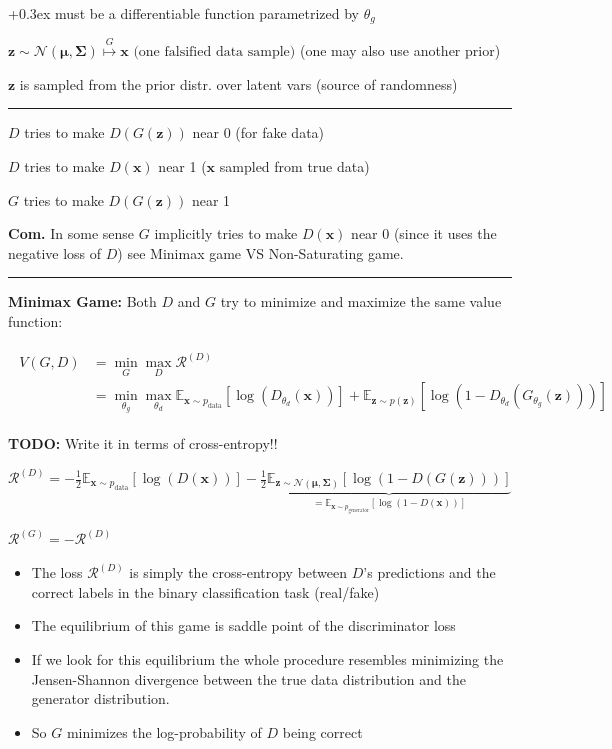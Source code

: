 \documentclass[a2paper,8pt]{extarticle}
\newcommand{\cN}{\mathcal{N}}
\newcommand{\cR}{\mathcal{R}}
\newcommand{\Exp}[2][]{{\mathbb{E}_{#1}}\left[ #2
\right]}
\newcommand{\mat}[1]{\mathbf{#1}}
\renewcommand{\vec}[1]{\mathbf{#1}}
\newcommand{\vx}{\vec{x}}
\newcommand{\vz}{\vec{z}}
\newcommand{\vmu}{\boldsymbol{\mu}}
\newcommand{\MSigma}{\mat{\Sigma}}
\newcommand{\todo}[1]{\textbf{TODO:} #1}
\newcommand{\todo}[1]{%
}
\newcommand{\customboxpaddingsize}{0pt}
\newcommand{\emptyarg}[1][]{\ifthenelse{\isempty{#1}}{}{\ (#1)}}
\newcommand{\Def}[1][]{{\setlength\fboxsep{\customboxpaddingsize}
\colorbox{defcolor}{%
\color{custtitlecolor}{\textbf{D.\emptyarg[#1]}}}\kern+0.3ex}}
\newcommand{\Com}{\textbf{Com.} }
\newcommand{\sep}{\vspace{0pt}\noindent\hrule\vspace{0pt}}
\newcommand{\ssep}{\hdashrule[1.1ex]{\linewidth}{0.1pt}{0.3mm}\vspace{-6pt}}
\newcommand{\sep}{\vspace{5pt}\noindent\hrule\vspace{5pt}}
\newcommand{\ssep}{\hdashrule[1.1ex]{\linewidth}{0.1pt}{0.3mm}\vspace{-3pt}}
\begin{document}
\begin{landscape}
\begin{multicols*}{7}
\ssep

\Def[Generator $G$] must be a differentiable function parametrized by $\theta_g$

$
\vz\sim\cN(\vmu,\MSigma)
\stackrel{G}{\mapsto}
\vx
\text{ (one falsified data sample)}
$ (one may also use another prior)

$\vz$ is sampled from the prior distr. over latent vars (source of randomness)

\sep

$D$ tries to make $D(G(\vz))$ near 0 (for fake data)

$D$ tries to make $D(\vx)$ near 1 ($\vx$ sampled from true data)

$G$ tries to make $D(G(\vz))$ near 1

\Com In some sense $G$ implicitly tries to make $D(\vx)$ near 0 (since it uses
the negative loss of $D$) see Minimax game VS Non-Saturating game.

\sep

\textbf{Minimax Game:} Both $D$ and $G$ try to minimize and maximize the same
value function:

\begin{gather*}
\begin{align*}
V(G,D)
&=\min_{G}\max_{D} \cR^{(D)}
\\
&=\min_{\theta_g}\max_{\theta_d}
\Exp[\vx\sim p_{\text{data}}]{\log(D_{\theta_d}(\vx))}
+
\Exp[\vz\sim p(\vz)]{\log(1-D_{\theta_d}(G_{\theta_g}(\vz)))}
\end{align*}
\end{gather*}

\todo{Write it in terms of cross-entropy!!}

$
\cR^{(D)}
=
-\frac{1}{2}
\Exp[\vx\sim p_{\text{data}}]{\log(D(\vx))}
-\frac{1}{2}
\underbrace{\Exp[\vz\sim \cN(\vmu,\MSigma)]{\log(1-D(G(\vz)))}}_{=
\Exp[\vx\sim p_{\text{generator}}]{\log(1-D(\vx))}}
$

$
\cR^{(G)}
=
-\cR^{(D)}
$ 

\begin{itemize}
  \item The loss $\cR^{(D)}$ is simply the cross-entropy between $D$'s
  predictions and the correct labels in the binary classification task (real/fake)
  \item The equilibrium of this game is saddle point of the discriminator loss
  \item If we look for this equilibrium the whole procedure resembles
  minimizing the Jensen-Shannon divergence between the true data distribution
  and the generator distribution.
  \item So $G$ minimizes the log-probability of $D$ being correct
\end{itemize}


\end{multicols*}
\end{landscape}
\end{document}
